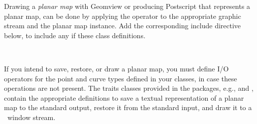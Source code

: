 Drawing a {\em planar map} with Geomview or producing Postscript that
represents a planar map, can be done by applying the 
operator to the appropriate graphic stream and the planar map
instance. Add the corresponding include directive below, to include
any if these class definitions.

\\


If you intend to save, restore, or draw a planar map, you must
define I/O operators for the point and curve types defined in your
 classes, in case these operations are not present. The
traits classes provided in the  packages, e.g.,
 and ,
contain the appropriate definitions to save a textual representation
of a planar map to the standard output, restore it from the standard 
input, and draw it to a \cgal\ window stream.


